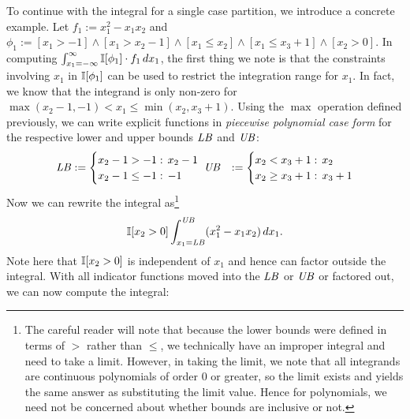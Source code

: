 \documentclass[letterpaper]{article}
\renewcommand{\-}{\text{-}}
\begin{document}
{To continue with the integral for a single case partition, we
introduce a concrete example.  Let $f_1 := x_1^2 - x_1 x_2$ and $\phi_1
:= [x_1 > -1] \land [x_1 > x_2-1] \land [x_1 \leq x_2] \land [x_1 \leq x_3 +1] \land [x_2 > 0]$.  
In computing $\int_{x_1=-\infty}^{\infty} \mathbb{I}[\phi_1] \cdot f_1 \, dx_1$,
the first thing we note is that the constraints involving $x_1$ in
$\mathbb{I}[\phi_1]$ can be used to restrict the integration range for $x_1$.
In fact, we know that the integrand is only non-zero for
$\max(x_2 - 1, -1) < x_1 \leq \min(x_2,x_3 + 1)$.  Using the $\max$
operation defined previously, we can 
write explicit functions in 
\emph{piecewise polynomial case form} for the respective 
lower and upper bounds $\mathit{LB}$ and $\mathit{UB}$:
{\footnotesize
\vspace{-1mm}
\begin{align*}
\LB &:=\begin{cases}
    x_2-1 > -1:&\hspace{-2mm} x_2 - 1 \\ 
    x_2-1 \leq -1:&\hspace{-2mm} -1 \\ 
  \end{cases}\;
\UB &:=\begin{cases}
    x_2<x_3+1:&\hspace{-2mm} x_2 \\ 
    x_2\geq x_3+1:&\hspace{-2mm} x_3 + 1 \\ 
  \end{cases}
\end{align*}
}
Now we can rewrite the integral as\footnote{The careful reader will note
that because the lower bounds were defined in terms of $>$
rather than $\leq$, we technically have an improper integral
and need to take a limit.  However, in taking the limit, we
note that all integrands are continuous polynomials
of order 0 or greater, so the limit exists and yields the
same answer as substituting the limit value.  Hence for 
polynomials, we need not be concerned about whether bounds
are inclusive or not.}
\vspace{-1mm}
\begin{equation}
\mathbb{I}[x_2 > 0] \int_{x_1=\mathit{LB}}^{\mathit{UB}} (x_1^2 - x_1 x_2) \, dx_1 .
\end{equation}
Note here that $\mathbb{I}[x_2 > 0]$ is independent of $x_1$ and hence
can factor outside the integral.  With all indicator functions
moved into the $\mathit{LB}$ or $\mathit{UB}$ or factored out, we can now compute
the integral:
\vspace{-1mm}
}
\end{document}
